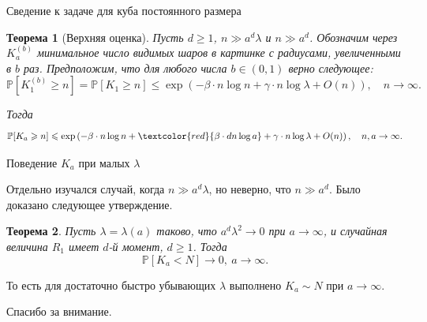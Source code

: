 \documentclass[aspectratio=1610]{beamer}
\theoremstyle{plain}
\newtheorem{thm}{Теорема} %
\theoremstyle{definition}
\theoremstyle{remark}
\def\geq{\geqslant}
\def\leq{\leqslant}
\newcommand{\PP}{\mathbb{P}}
\begin{document}
\begin{frame}{Сведение к задаче для куба постоянного размера}

\begin{thm}[Верхняя оценка]
    Пусть $d\geq 1$,  $n \gg a^d\lambda$ и $n \gg a^d$. Обозначим через $K_a^{(b)}$ минимальное число видимых шаров в картинке с радиусами, увеличенными в $b$ раз.
Предположим, что для любого числа $b \in (0, 1)$ верно следующее:
\begin{equation*}
    \PP[K_1^{(b)} \geq n] =\PP[K_1 \geq n] \leq \exp \left(-\beta\cdot n\log n + \gamma\cdot n\log\lambda + O(n)\right),\quad  n \to \infty.
\end{equation*}
    


Тогда 
\begin{equation*}
    \PP[K_a \geq n] \leq \exp \left(-\beta\cdot n\log n + \textcolor{red}{\beta\cdot dn\log a} + \gamma\cdot n\log\lambda + O(n)\right),\quad  n, a \to \infty.
\end{equation*}{}
\end{thm}
    
\end{frame}

\begin{frame}{Поведение $K_a$ при малых $\lambda$}

Отдельно изучался случай, когда $n\gg a^d\lambda$, но неверно, что $n\gg a^d$. Было доказано следующее утверждение.

\begin{thm}
    Пусть $\lambda = \lambda(a)$ таково, что $a^d\lambda^2 \to 0$ при $a\to\infty$, и случайная величина $R_1$ имеет $d$-й момент, $d\geq 1$. Тогда $$\PP[K_a < N] \to 0, \  a\to\infty.$$
\end{thm}

То есть для достаточно быстро убывающих $\lambda$ выполнено $K_a \sim N$ при $a\to\infty$.
    
\end{frame}


\begin{frame}
\begin{center}
\Huge Спасибо за внимание.
\end{center}
\end{frame}
\end{document}
